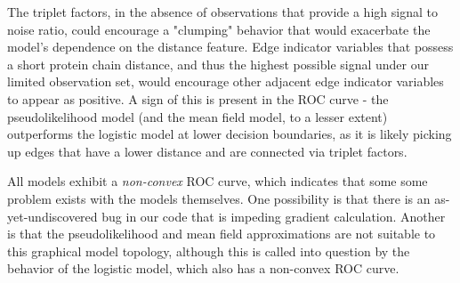 \documentclass{article}
\begin{document}
The triplet factors, in the absence of observations that provide a high signal to noise ratio, could encourage a "clumping" behavior that would exacerbate the model's dependence on the distance feature. Edge indicator variables that possess a short protein chain distance, and thus the highest possible signal under our limited observation set, would encourage other adjacent edge indicator variables to appear as positive. A sign of this is present in the ROC curve - the pseudolikelihood model (and the mean field model, to a lesser extent) outperforms the logistic model at lower decision boundaries, as it is likely picking up edges that have a lower distance and are connected via triplet factors. 

All models exhibit a \textit{non-convex} ROC curve, which indicates that some some problem exists with the models themselves. One possibility is that there is an as-yet-undiscovered bug in our code that is impeding gradient calculation. Another is that the pseudolikelihood and mean field approximations are not suitable to this graphical model topology, although this is called into question by the behavior of the logistic model, which also has a non-convex ROC curve.
\end{document}
